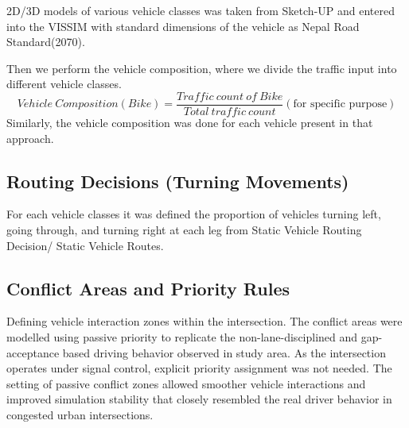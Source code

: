 2D/3D models of various vehicle classes was taken from Sketch-UP and entered into the VISSIM with standard dimensions of the
vehicle as Nepal Road Standard(2070).


Then we perform the vehicle composition, where we divide the traffic input into different vehicle classes.
$$
Vehicle\ Composition (Bike) = \frac{Traffic\ count\ of\ Bike}{Total\ traffic\ count} (\text{for specific purpose})
$$
Similarly, the vehicle composition was done for each vehicle present in that approach.


\subsection{Routing Decisions (Turning Movements)}
For each vehicle classes it was defined the proportion of vehicles turning left, going through, and turning right at each 
leg from Static Vehicle Routing Decision/ Static Vehicle Routes. 


\subsection{Conflict Areas and Priority Rules}
 Defining vehicle interaction zones within the intersection. The conflict areas were modelled using passive priority 
 to replicate the non-lane-disciplined and gap-acceptance based driving behavior observed in study area. As the 
 intersection operates under signal control, explicit priority assignment was not needed. The setting of passive 
 conflict zones allowed smoother vehicle interactions and improved simulation stability that closely resembled the 
 real driver behavior in congested urban intersections.



